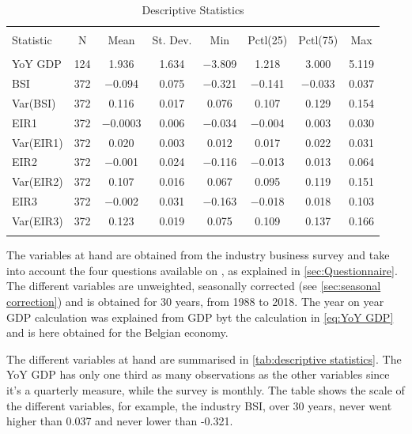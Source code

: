 \documentclass[12pt,a4paper,oneside]{book}
\begin{document}
\begin{table}[!htbp]  \centering \footnotesize 
  \caption{Descriptive Statistics} 
  \label{tab:descriptive statistics} 
\begin{tabular}{@{\extracolsep{5pt}}lccccccc} 
\\[-1.8ex]\hline 
\hline \\[-1.8ex] 
Statistic & \multicolumn{1}{c}{N} & \multicolumn{1}{c}{Mean} & \multicolumn{1}{c}{St. Dev.} & \multicolumn{1}{c}{Min} & \multicolumn{1}{c}{Pctl(25)} & \multicolumn{1}{c}{Pctl(75)} & \multicolumn{1}{c}{Max} \\ 
\hline \\[-1.8ex] 
YoY GDP     & 124       & 1.936 & 1.634 & $-$3.809 & 1.218 & 3.000 & 5.119 \\ 
BSI         & 372       & $-$0.094 & 0.075 & $-$0.321 & $-$0.141 & $-$0.033 & 0.037 \\ 
Var(BSI)    & 372       & 0.116 & 0.017 & 0.076 & 0.107 & 0.129 & 0.154 \\ 
EIR1        & 372       & $-$0.0003 & 0.006 & $-$0.034 & $-$0.004 & 0.003 & 0.030 \\ 
Var(EIR1)   & 372       & 0.020 & 0.003 & 0.012 & 0.017 & 0.022 & 0.031 \\ 
EIR2        & 372       & $-$0.001  & 0.024 & $-$0.116 & $-$0.013 & 0.013 & 0.064 \\ 
Var(EIR2)   & 372       & 0.107 & 0.016 & 0.067 & 0.095 & 0.119 & 0.151 \\ 
EIR3        & 372  & $-$0.002  & 0.031 & $-$0.163 & $-$0.018 & 0.018 & 0.103 \\ 
Var(EIR3)   & 372       & 0.123 & 0.019 & 0.075 & 0.109 & 0.137 & 0.166 \\ 
\hline \\[-1.8ex] 
\end{tabular} 
\end{table} 

The variables at hand are obtained from the industry business survey and take into account the four questions available on , as explained in \autoref{sec:Questionnaire}.
The different variables are unweighted, seasonally corrected (see \autoref{sec:seasonal correction}) and is obtained for 30 years, from 1988 to 2018.
The year on year GDP calculation was explained from GDP byt the calculation in \autoref{eq:YoY GDP} and is here obtained for the Belgian economy.

The different variables at hand are summarised in \autoref{tab:descriptive statistics}. The YoY GDP has only one third as many observations as the other variables since it's a quarterly measure, while the survey is monthly. 
The table shows the scale of the different variables, for example, the industry BSI, over 30 years, never went higher than 0.037 and never lower than -0.321.
\end{document}
